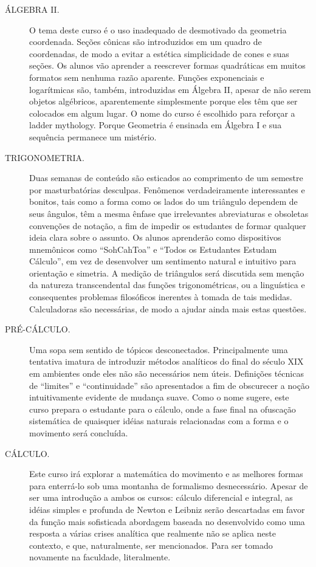 \documentclass[a4paper,oneside,10pt,notitlepage]{article}
\begin{document}
\begin{description}
\item[ÁLGEBRA II.]
O tema deste curso é o uso inadequado de desmotivado da geometria coordenada.
Seções cônicas são introduzidos em um quadro de coordenadas, de modo a evitar a estética simplicidade de cones e suas seções.
Os alunos vão aprender a reescrever formas quadráticas em muitos formatos sem nenhuma razão aparente.
Funções exponenciais e logarítmicas são, também, introduzidas em Álgebra II, apesar de não serem objetos algébricos, aparentemente simplesmente porque eles têm que ser colocados em algum lugar.
O nome do curso é escolhido para reforçar a ladder mythology.
Porque Geometria é ensinada em Álgebra I e sua sequência permanece um mistério.

\item[TRIGONOMETRIA.]
Duas semanas de conteúdo são esticados ao comprimento de um semestre por masturbatórias desculpas.
Fenômenos verdadeiramente interessantes e bonitos, tais como a forma como os lados do um triângulo dependem de seus ângulos, têm a mesma ênfase que irrelevantes abreviaturas e obsoletas convenções de notação, a fim de impedir os estudantes de formar qualquer ideia clara sobre o assunto.
Os alunos aprenderão como dispositivos mnemônicos como ``SohCahToa'' e ``Todos os Estudantes Estudam Cálculo'', em vez de desenvolver um sentimento natural e intuitivo para orientação e simetria.
A medição de triângulos será discutida sem menção da natureza transcendental das funções trigonométricas, ou a linguística e consequentes problemas filosóficos inerentes à tomada de tais medidas.
Calculadoras são necessárias, de modo a ajudar ainda mais estas questões.

\item[PRÉ-CÁLCULO.]
Uma sopa sem sentido de tópicos desconectados.
Principalmente uma tentativa imatura de introduzir métodos analíticos do final do século XIX em ambientes onde eles não são necessários nem úteis.
Definições técnicas de ``limites'' e ``continuidade'' são apresentados a fim de obscurecer a noção intuitivamente evidente de mudança suave.
Como o nome sugere, este curso prepara o estudante para o cálculo, onde a fase final na ofuscação sistemática de quaisquer idéias naturais relacionadas com a forma e o movimento será concluída.

\item[CÁLCULO.]
Este curso irá explorar a matemática do movimento e as melhores formas para enterrá-lo sob uma montanha de formalismo desnecessário.
Apesar de ser uma introdução a ambos os cursos: cálculo diferencial e integral, as idéias simples e profunda de Newton e Leibniz serão descartadas em favor da função mais sofisticada abordagem baseada no desenvolvido como uma resposta a várias crises analítica que realmente não se aplica neste contexto, e que, naturalmente, ser mencionados.
Para ser tomado novamente na faculdade, literalmente. 
\end{description}
\end{document}
